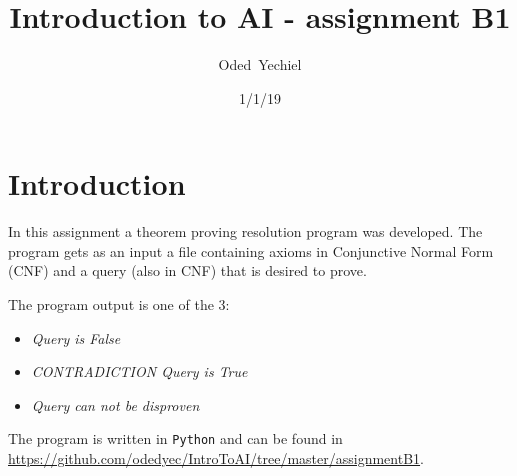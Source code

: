 \documentclass{article}                     %
\begin{document}
	
	\title{Introduction to AI - assignment B1}
	
	
	\author{Oded~Yechiel}
	
	\date{1/1/19}
	
	\maketitle
	
	\section{Introduction}
	In this assignment a theorem proving resolution program was developed. The program gets as an input a file containing axioms in Conjunctive Normal Form (CNF) and a query (also in CNF) that is desired to prove.
	
	The program output is one of the 3:
	\begin{itemize}
		\item \textit{Query is False}
		\item \textit{CONTRADICTION Query is True}
		\item \textit{Query can not be disproven}
	\end{itemize}
	The program is written in \texttt{Python} and can be found in \url{https://github.com/odedyec/IntroToAI/tree/master/assignmentB1}.
\end{document}
